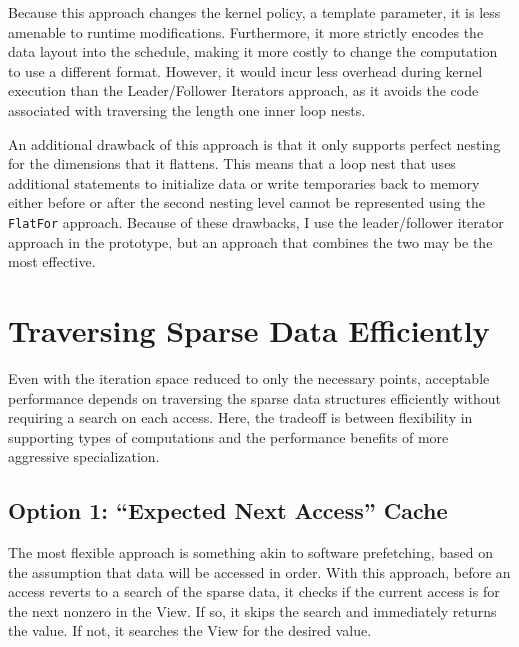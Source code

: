Because this approach changes the kernel policy, a template parameter, it is less amenable to runtime modifications. 
Furthermore, it more strictly encodes the data layout into the schedule, making it more costly to change the computation to use a different format.
However, it would incur less overhead during kernel execution than the Leader/Follower Iterators approach, as it avoids the code associated with traversing the length one inner loop nests.

An additional drawback of this approach is that it only supports perfect nesting for the dimensions that it flattens. 
This means that a loop nest that uses additional statements to initialize data or write temporaries back to memory either before or after the second nesting level cannot be represented using the \verb.FlatFor. approach.
Because of these drawbacks, I use the leader/follower iterator approach in the prototype, but an approach that combines the two may be the most effective.


\section{Traversing Sparse Data Efficiently}

Even with the iteration space reduced to only the necessary points, acceptable performance depends on traversing the sparse data structures efficiently without requiring a search on each access.
Here, the tradeoff is between flexibility in supporting types of computations and the performance benefits of more aggressive specialization.

\subsection{Option 1: ``Expected Next Access'' Cache}

The most flexible approach is something akin to software prefetching, based on the assumption that data will be accessed in order. 
With this approach, before an access reverts to a search of the sparse data, it checks if the current access is for the next nonzero in the View.
If so, it skips the search and immediately returns the value.
If not, it searches the View for the desired value.

